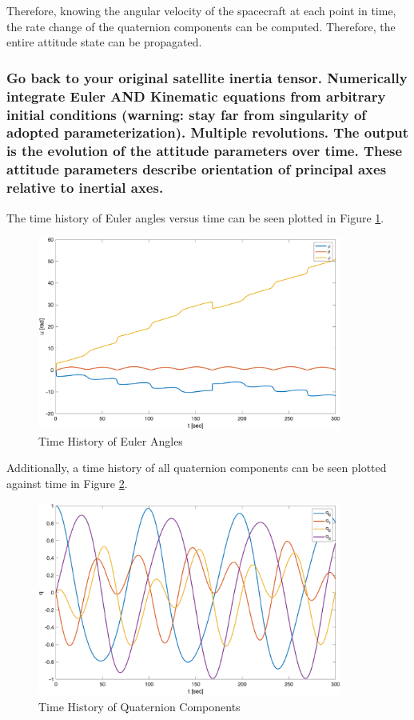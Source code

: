 Therefore, knowing the angular velocity of the spacecraft at each point in time, the rate change of the quaternion components can be computed. Therefore, the entire attitude state can be propagated.

\subsubsection{Go back to your original satellite inertia tensor. Numerically integrate Euler AND Kinematic equations from arbitrary initial conditions (warning: stay far from singularity of adopted parameterization). Multiple revolutions. The output is the evolution of the attitude parameters over time. These attitude parameters describe orientation of principal axes relative to inertial axes.}

The time history of Euler angles versus time can be seen plotted in  Figure \ref{fig:time_history_EA}.

\begin{figure} [H]
    \centering
    \captionsetup{justification = centering}
    \includegraphics[width = 10cm] {Images/time_history_EA.png}
    \caption{Time History of Euler Angles}
    \label{fig:time_history_EA}
\end{figure}

Additionally, a time history of all quaternion components can be seen plotted against time in Figure \ref{fig:time_history_quaternion}. 

\begin{figure} [H]
    \centering
    \captionsetup{justification = centering}
    \includegraphics[width = 10cm] {Images/time_history_quat.png}
    \caption{Time History of Quaternion Components}
    \label{fig:time_history_quaternion}
\end{figure}

